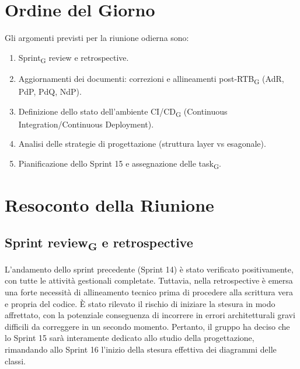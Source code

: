 \section{Ordine del Giorno}
Gli argomenti previsti per la riunione odierna sono:
\begin{enumerate}
	\item Sprint\textsubscript{G} review e retrospective.
	\item Aggiornamenti dei documenti: correzioni e allineamenti post-RTB\textsubscript{G} (AdR, PdP, PdQ, NdP).
	\item Definizione dello stato dell'ambiente CI/CD\textsubscript{G} (Continuous Integration/Continuous Deployment).
	\item Analisi delle strategie di progettazione (struttura layer vs esagonale).
	\item Pianificazione dello Sprint 15 e assegnazione delle task\textsubscript{G}.
\end{enumerate}

\section{Resoconto della Riunione}

\subsection{Sprint review\textsubscript{G} e retrospective}
L'andamento dello sprint precedente (Sprint 14) è stato verificato positivamente, con tutte le attività gestionali completate. Tuttavia, nella retrospective è emersa una forte necessità di allineamento tecnico prima di procedere alla scrittura vera e propria del codice. È stato rilevato il rischio di iniziare la stesura in modo affrettato, con la potenziale conseguenza di incorrere in errori architetturali gravi difficili da correggere in un secondo momento. Pertanto, il gruppo ha deciso che lo Sprint 15 sarà interamente dedicato allo studio della progettazione, rimandando allo Sprint 16 l'inizio della stesura effettiva dei diagrammi delle classi.

